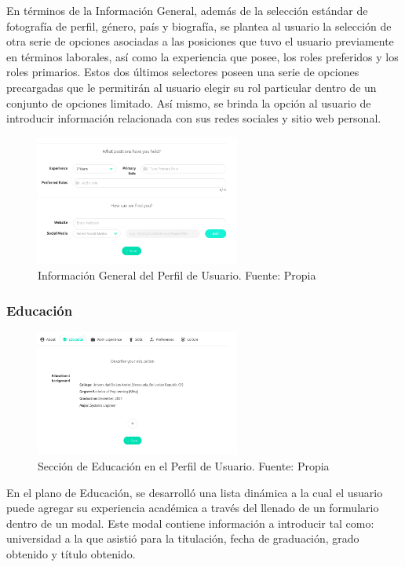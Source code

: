 En términos de la Información General, además de la selección estándar de fotografía de perfil, género, país y biografía, se plantea al usuario la selección de otra serie de opciones asociadas a las posiciones que tuvo el usuario previamente en términos laborales, así como la experiencia que posee, los roles preferidos y los roles primarios. Estos dos últimos selectores poseen una serie de opciones precargadas que le permitirán al usuario elegir su rol particular dentro de un conjunto de opciones limitado. Así mismo, se brinda la opción al usuario de introducir información relacionada con sus redes sociales y sitio web personal.

\begin{figure}[H]
\centering
\includegraphics[width=0.60\textwidth]{img/21.png}
\caption{Información General del Perfil de Usuario. Fuente: Propia}
\label{figure:userGeneralInfo}
\end{figure}

\subsubsection{Educación}

\begin{figure}[H]
\centering
\includegraphics[width=0.60\textwidth]{img/22.png}
\caption{Sección de Educación en el Perfil de Usuario. Fuente: Propia}
\label{figure:usersEducation}
\end{figure}

En el plano de Educación, se desarrolló una lista dinámica a la cual el usuario puede agregar su experiencia académica a través del llenado de un formulario dentro de un modal. Este modal contiene información a introducir tal como: universidad a la que asistió para la titulación, fecha de graduación, grado obtenido y título obtenido.

